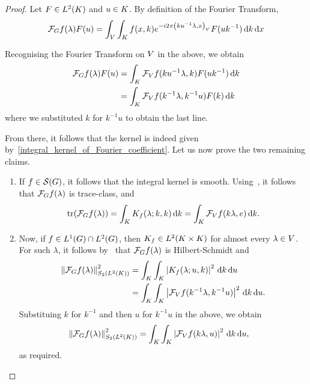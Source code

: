 \begin{proof}
    Let $F \in \Lebesgue{2}\CompactGroup$ and $u \in \CompactGroup$.
    By definition of the Fourier Transform,
    \begin{align*}
        \Fourier f(\lambda) F(u) =
        \int_\VectorSpace
            \int_\CompactGroup
                f(x, k) \e^{-\i \turn \ip{k u^{-1} \lambda}{x}} F(u k^{-1})
            \dd k
        \dd x
    \end{align*}

    Recognising the Fourier Transform on $\VectorSpace$ in the above, we obtain
    \begin{align*}
        \Fourier f(\lambda) F(u)
        &=
        \int_\CompactGroup
            \Fourier[\VectorSpace] f(k u^{-1} \lambda, k) F(u k^{-1})
        \dd k\\
        &=
        \int_\CompactGroup
            \Fourier[\VectorSpace] f(k^{-1} \lambda, k^{-1} u) F(k)
        \dd k
    \end{align*}
    where we substituted $k$ for $k^{-1} u$ to obtain the last line.

    From there, it follows that the kernel is indeed given by~\eqref{integral_kernel_of_Fourier_coefficient}.
    Let us now prove the two remaining claims.

    \begin{enumerate}
        \item If $f \in \Schwartz\Group$, it follows that the integral kernel is smooth.
            Using~\cite[Corollary 4.1]{DelgadoRuzhansky14}, it follows that $\Fourier f(\lambda)$ is trace-class, and
            \begin{align*}
            \tr(\Fourier f(\lambda))
            = \int_\CompactGroup K_f(\lambda; k, k) \dd k
            = \int_\CompactGroup \Fourier[\VectorSpace] f(k \lambda, e) \dd k.
        \end{align*}
    \item Now, if $f \in \Lebesgue{1}\Group \cap \Lebesgue{2}\Group$,
        then $K_{f} \in \Lebesgue{2}{\CompactGroup \times \CompactGroup}$ for almost every $\lambda \in \VectorSpace$.
        For such $\lambda$, it follows by~\cite[Theorem VI.23]{Reed72} that $\Fourier f(\lambda)$ is Hilbert-Schmidt and
        \begin{align*}
            \norm[\SchattenClasses{2}{\Lebesgue{2}\CompactGroup}]{\Fourier f(\lambda)}^2
            &= \int_\CompactGroup \int_\CompactGroup \abs{K_f(\lambda; u, k)}^2 \dd k \dd u\\
            &= \int_\CompactGroup \int_\CompactGroup \abs{\Fourier[\VectorSpace] f(k^{-1} \lambda, k^{-1} u)}^2 \dd k \dd u.
        \end{align*}
        Substituing $k$ for $k^{-1}$ and then $u$ for $k^{-1} u$ in the above, we obtain
        \begin{align*}
            \norm[\SchattenClasses{2}{\Lebesgue{2}\CompactGroup}]{\Fourier f(\lambda)}^2
            &= \int_\CompactGroup \int_\CompactGroup \abs{\Fourier[\VectorSpace] f(k \lambda, u)}^2 \dd k \dd u,
        \end{align*}
        as required.
    \end{enumerate}
\end{proof}

